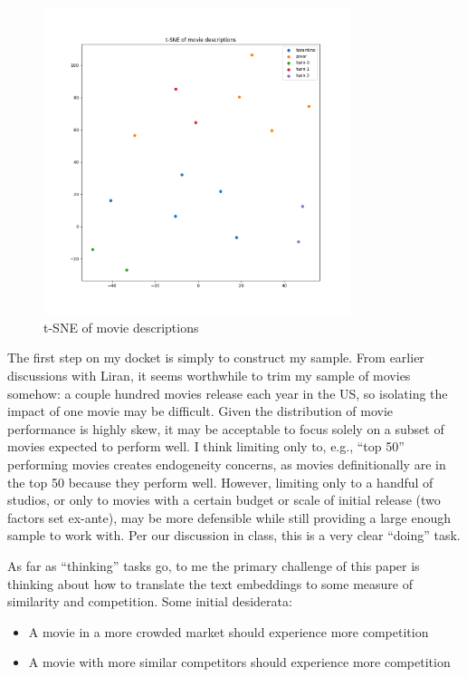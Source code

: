 \documentclass{article}
\begin{document}
\begin{figure}[h]
    \centering
    \includegraphics[width=0.8\textwidth]{tsne.png}
    \caption{t-SNE of movie descriptions}
    \label{fig:tsne}
\end{figure}

The first step on my docket is simply to construct my sample. From earlier discussions with Liran, it seems worthwhile to trim my sample of movies somehow: a couple hundred movies release each year in the US, so isolating the impact of one movie may be difficult. Given the distribution of movie performance is highly skew, it may be acceptable to focus solely on a subset of movies expected to perform well. I think limiting only to, e.g., ``top 50'' performing movies creates endogeneity concerns, as movies definitionally are in the top 50 because they perform well. However, limiting only to a handful of studios, or only to movies with a certain budget or scale of initial release (two factors set ex-ante), may be more defensible while still providing a large enough sample to work with. Per our discussion in class, this is a very clear ``doing'' task.

As far as ``thinking'' tasks go, to me the primary challenge of this paper is thinking about how to translate the text embeddings to some measure of similarity and competition. Some initial desiderata:
\begin{itemize}
    \item A movie in a more crowded market should experience more competition
    \item A movie with more similar competitors should experience more competition
\end{itemize}
\end{document}
